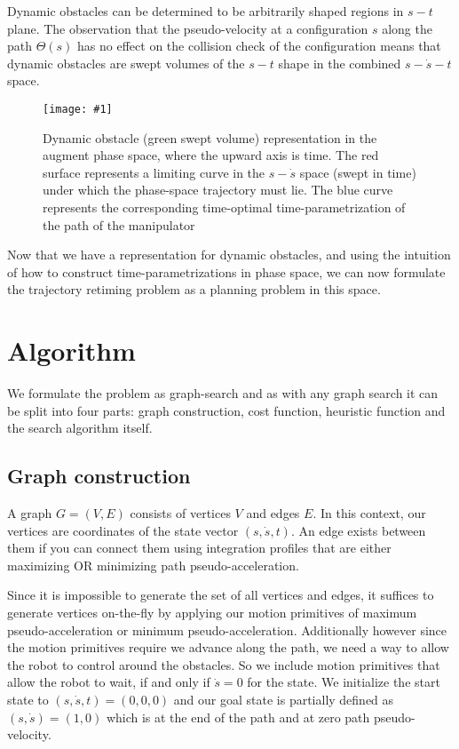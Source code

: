 \documentclass[letterpaper,12pt]{article} %
\newcommand{\ffig}[3]{
    \begin{figure}[h!]
    \centering
    \texttt{[image: \#1]}
    \caption{#2}
    \label{fig:#3}
    \end{figure}
}
\begin{document}
Dynamic obstacles can be determined to be arbitrarily shaped regions in $s-t$ plane. The observation that the pseudo-velocity at a configuration $s$ along the path $\Theta(s)$ has no effect on the collision check of the configuration means that dynamic obstacles are swept volumes of the $s-t$ shape in the combined $s-\dot{s}-t$ space.

\ffig{pics/representation3d1}{Dynamic obstacle (green swept volume) representation in the augment phase space, where the upward axis is time. The red surface represents a limiting curve in the $s-\dot{s}$ space (swept in time) under which the phase-space trajectory must lie. The blue curve represents the corresponding time-optimal time-parametrization of the path of the manipulator}{dynobjrep}

Now that we have a representation for dynamic obstacles, and using the intuition of how to construct time-parametrizations in phase space, we can now formulate the trajectory retiming problem as a planning problem in this space.

\section{Algorithm}\label{subsec:alg}

We formulate the problem as graph-search and as with any graph search it can be split into four parts: graph construction, cost function, heuristic function and the search algorithm itself.

\subsection{Graph construction}\label{subsec:graph}

A graph $G = (V, E)$ consists of vertices $V$ and edges $E$. In this context, our vertices are coordinates of the state vector $(s, \dot{s}, t)$. An edge exists between them if you can connect them using integration profiles that are either maximizing OR minimizing path pseudo-acceleration.

Since it is impossible to generate the set of all vertices and edges, it suffices to generate vertices on-the-fly by applying our motion primitives of maximum pseudo-acceleration or minimum pseudo-acceleration. Additionally however since the motion primitives require we advance along the path, we need a way to allow the robot to control around the obstacles. So we include motion primitives that allow the robot to wait, if and only if $\dot{s} = 0$ for the state. We initialize the start state to $(s,\dot{s},t)=(0, 0, 0)$ and our goal state is partially defined as $(s,\dot{s})=(1, 0)$ which is at the end of the path and at zero path pseudo-velocity.
\end{document}
